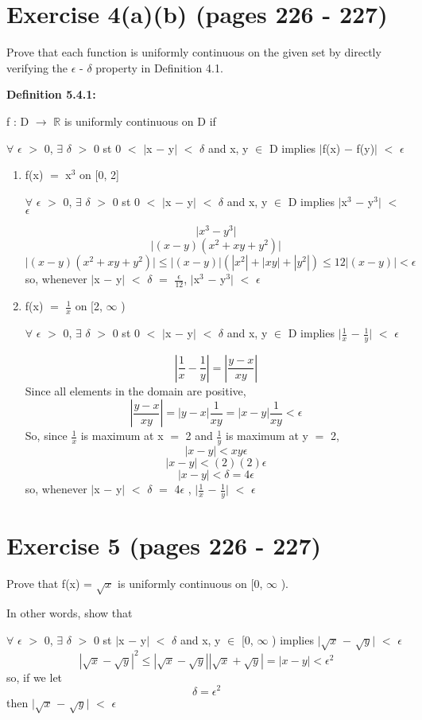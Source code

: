 \documentclass{article}
\newcommand{\mt}[1]{\ensuremath{#1}}
\newcommand\bsc[2][\DefaultOpt]{%
  \def\DefaultOpt{#2}%
  \section[#1]{#2}%
}
\newcommand{\balist}{\begin{enumerate}[label=\alph*.]}
\newcommand{\elist}{\end{enumerate}}
\newcommand{\br}{\mt{\mathbb{R}} }       %
\newcommand{\ep}{\mt{\epsilon} }         %
\newcommand{\fa}{\mt{\forall} }          %
\newcommand{\dta}{\mt{\delta} }
\newcommand{\mem}{\mt{\in} }
\newcommand{\exs}{\mt{\exists} }
\newcommand{\lra}{ \mt{\longrightarrow} } %
\newcommand{\av}[1]{\mt{|}#1\mt{|}}  %
\newcommand{\ms}{\mt{-} }
\newcommand{\ls}{\mt{<} }
\newcommand{\gr}{\mt{>} }
\newcommand{\lse}{\mt{\leq} }
\newcommand{\eql}{\mt{=} }
\newcommand{\uf}[2]{#1\mt{^{#2}}}
\newcommand{\frc}[2]{\mt{\frac{#1}{#2}}}
\newcommand{\eqn}[1]{\[#1\]}
\newcommand{\infy}{\mt{\infty} }
\begin{document}
\bsc{Exercise 4(a)(b) (pages 226 - 227)}{
Prove that each function is uniformly continuous on the given set by directly verifying the \ep - \dta property in Definition 4.1.

\textbf{Definition 5.4.1:}

f : D \lra \br is uniformly continuous on D if

\fa \ep \gr 0, \exs \dta \gr 0 st 0 \ls \av{x \ms y} \ls \dta and x, y \mem D implies \av{f(x) \ms f(y)} \ls \ep

\balist
\item f(x) \eql \uf{x}{3} on [0, 2]

\fa \ep \gr 0, \exs \dta \gr 0 st 0 \ls \av{x \ms y} \ls \dta and x, y \mem D implies \av{\uf{x}{3} \ms \uf{y}{3}} \ls \ep

\eqn{\av{\uf{x}{3} \ms \uf{y}{3}}}
\eqn{\av{(x - y)(x^2 + xy + y^2)}}
\eqn{\av{(x - y)(x^2 + xy + y^2)} \lse |(x - y)|(|x^2| + |xy| + |y^2|) \lse 12|(x - y)| \ls \ep}
so, whenever \av{x \ms y} \ls \dta \eql \frc{\ep}{12}, \av{\uf{x}{3} \ms \uf{y}{3}} \ls \ep

\item f(x) \eql \frc{1}{x} on [2, \infy)

\fa \ep \gr 0, \exs \dta \gr 0 st 0 \ls \av{x \ms y} \ls \dta and x, y \mem D implies \av{\frc{1}{x} \ms \frc{1}{y}} \ls \ep

\eqn{|\frac{1}{x} - \frac{1}{y}| = |\frac{y - x}{xy}|}
Since all elements in the domain are positive,
\eqn{|\frac{y - x}{xy}| = |y - x| \frac{1}{xy} = |x - y| \frac{1}{xy} \ls \ep}
So, since \frc{1}{x} is maximum at x \eql 2 and \frc{1}{y} is maximum at y \eql 2,
\eqn{|x - y| \ls xy\ep}
\eqn{|x - y| \ls (2)(2)\ep}
\eqn{|x - y| \ls \dta \eql 4\ep}
so, whenever \av{x \ms y} \ls \dta \eql 4\ep, \av{\frc{1}{x} \ms \frc{1}{y}} \ls \ep


\elist

}
\bsc{Exercise 5 (pages 226 - 227)}{

Prove that f(x) = $\sqrt{x}$ is uniformly continuous on [0, \infy).

In other words, show that

\fa \ep \gr 0, \exs \dta \gr 0 st \av{x \ms y} \ls \dta and x, y \mem [0, \infy) implies \av{$\sqrt{x}$ \ms $\sqrt{y}$} \ls \ep
\eqn{|\sqrt{x} - \sqrt{y}|^2 \lse |\sqrt{x} - \sqrt{y}||\sqrt{x} + \sqrt{y}| = |x - y| \ls \ep^2}
so, if we let
\eqn{\dta \eql \epsilon^2}
then \av{$\sqrt{x}$ \ms $\sqrt{y}$} \ls \ep

}

\newpage
\end{document}
